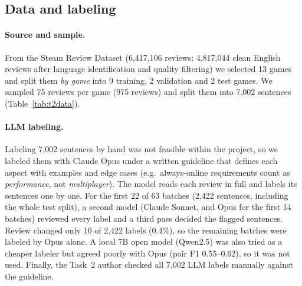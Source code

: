 \documentclass[11pt,a4paper]{article}
\begin{document}
\subsection{Data and labeling}

\paragraph{Source and sample.} From the Steam Review Dataset \citep{sobkowicz2017steam}
(6,417,106 reviews; 4,817,044 clean English reviews after language identification and
quality filtering) we selected 13 games and split them \emph{by game} into 9 training,
2 validation and 2 test games. We sampled 75 reviews per game (975 reviews) and split them into
7,002 sentences (Table~\ref{tab:t2data}).

\paragraph{LLM labeling.} Labeling 7,002 sentences by hand was not feasible within the project,
so we labeled them with Claude Opus \citep{anthropic2025claude} under a written guideline that
defines each aspect with examples and edge cases (e.g.\ always-online requirements count as
\emph{performance}, not \emph{multiplayer}). The model reads each review in full and labels its
sentences one by one. For the first 22 of 63 batches (2,422 sentences, including the whole test
split), a second model (Claude Sonnet, and Opus for the first 14 batches) reviewed every label
and a third pass decided the flagged sentences. Review changed only 10 of 2,422 labels (0.4\%),
so the remaining batches were labeled by Opus alone. A local 7B open model (Qwen2.5) was also
tried as a cheaper labeler but agreed poorly with Opus (pair F1 0.55--0.62), so it was not
used. Finally, the Task~2 author checked all 7,002 LLM labels manually against the guideline.
\end{document}
